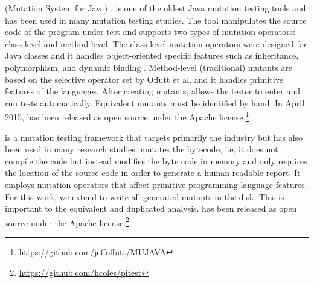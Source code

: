 \mujava{} (Mutation System for Java) \cite{OFFUTT:2005:1, OFFUT:2006:1}, is one of the oldest Java mutation testing tools and has been used in many mutation testing studies. 
The tool manipulates the source code of the program under test and supports two types of mutation operators: class-level and method-level. 
The class-level mutation operators were designed for Java classes and it handles object-oriented specific features such as inheritance, polymorphism, and dynamic binding \cite{MA:2002:1, OFFUT:2006:1}. 
Method-level (traditional) mutants are based on the selective operator set by Offutt et al. \cite{OFFUT:1996:1} and it handles primitive features of the languages.
After creating mutants, \mujava{} allows the tester to enter and run tests automatically.
Equivalent mutants must be identified by hand.
In April 2015, \mujava{} has been released as open source under the Apache license.\footnote{\url{https://github.com/jeffoffutt/MUJAVA}}

\pit{} \cite{PIT:2017} is a mutation testing framework that targets primarily the industry but has also been used in many research studies.
\pit{} mutates the bytecode, i.e, it does not compile the code but instead modifies the byte code in memory and \pit{} only requires the location of the source code in order to generate a human readable report.
It employs mutation operators that affect primitive programming language features.
For this work, we extend \pit{} to write all generated mutants in the disk. 
This is important to the equivalent and duplicated analysis. 
\pit{} has been released as open source under the Apache license.\footnote{\url{https://github.com/hcoles/pitest}}


